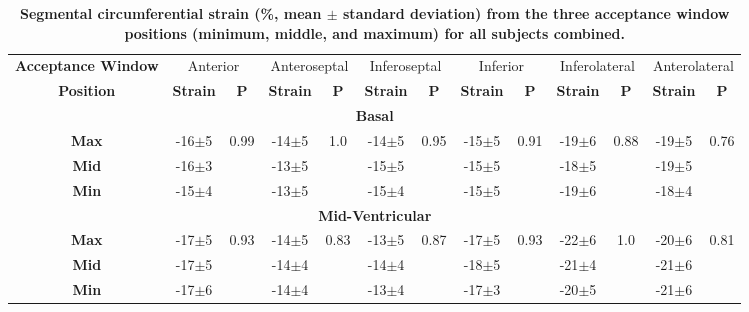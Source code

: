 	\begin{landscape}
	\begin{table}
		\centering
		\caption[Segmental circumferential strain (\%, mean $\pm$ standard deviation) from the three acceptance window positions (minimum, middle, and maximum) for all subjects combined]{\textbf{Segmental circumferential strain (\%, mean $\pm$ standard deviation) from the three acceptance window positions (minimum, middle, and maximum) for all subjects combined.}}
		\label{table:SegmentalEccStrainDiff}
		\begin{tabular}{ccccccccccccc}
			\toprule
			\multicolumn{1}{c}{\textbf{Acceptance Window}} & \multicolumn{2}{c}{Anterior} & \multicolumn{2}{c}{Anteroseptal} & \multicolumn{2}{c}{Inferoseptal} &
			\multicolumn{2}{c}{Inferior} & \multicolumn{2}{c}{Inferolateral} & \multicolumn{2}{c}{Anterolateral}\\
			\multicolumn{1}{c}{\textbf{Position}} & \textbf{Strain} & \textbf{P} & \textbf{Strain} & \textbf{P} & \textbf{Strain} & \textbf{P} &
			\textbf{Strain} & \textbf{P} & \textbf{Strain} & \textbf{P} & \textbf{Strain} & \textbf{P} \\
			\midrule
			
			\multicolumn{13}{c}{\textbf{Basal}} \\
			\midrule
			\textbf{Max} & -16$\pm$5 & \multirow{3}{*}{0.99} & -14$\pm$5 & \multirow{3}{*}{1.0} & -14$\pm$5 & \multirow{3}{*}{0.95}
			& -15$\pm$5 & \multirow{3}{*}{0.91} & -19$\pm$6 & \multirow{3}{*}{0.88} & -19$\pm$5 & \multirow{3}{*}{0.76} \\
			\textbf{Mid} & -16$\pm$3 &                       & -13$\pm$5 &                       & -15$\pm$5 & 
			& -15$\pm$5 &                       & -18$\pm$5 &                       & -19$\pm$5 &                       \\
			\textbf{Min} & -15$\pm$4 &                       & -13$\pm$5 &                       & -15$\pm$4 & 
			& -15$\pm$5 &                       & -19$\pm$6 &                       & -18$\pm$4 &  \\ 
			\midrule
			
			\multicolumn{13}{c}{\textbf{Mid-Ventricular}} \\
			\midrule
			\textbf{Max} & -17$\pm$5 & \multirow{3}{*}{0.93} & -14$\pm$5 & \multirow{3}{*}{0.83} & -13$\pm$5 & \multirow{3}{*}{0.87}
			& -17$\pm$5 & \multirow{3}{*}{0.93} & -22$\pm$6 & \multirow{3}{*}{1.0}  & -20$\pm$6 & \multirow{3}{*}{0.81} \\
			\textbf{Mid} & -17$\pm$5 &                       & -14$\pm$4 &                       & -14$\pm$4 & 
			& -18$\pm$5 &                       & -21$\pm$4 &                       & -21$\pm$6 &                       \\
			\textbf{Min} & -17$\pm$6 &                       & -14$\pm$4 &                       & -13$\pm$4 & 
			& -17$\pm$3 &                       & -20$\pm$5 &                       & -21$\pm$6 & \\ 
			\midrule
			

\end{tabular}
\end{table}
\end{landscape}
